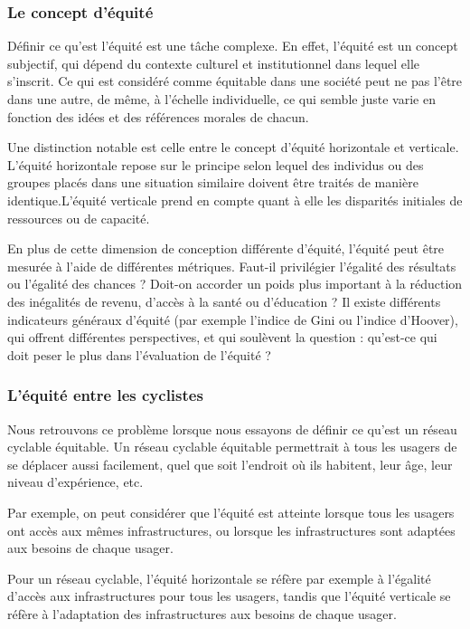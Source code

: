\subsubsection{Le concept d'équité}

Définir ce qu'est l'équité est une tâche complexe. En effet, l'équité est un concept subjectif, qui dépend du contexte culturel et institutionnel dans lequel elle s'inscrit. Ce qui est considéré comme équitable dans une société peut ne pas l'être dans une autre, de même, à l'échelle individuelle, ce qui semble juste varie en fonction des idées et des références morales de chacun.

Une distinction notable est celle entre le concept d'équité horizontale et verticale. L'équité horizontale repose sur le principe selon lequel des individus ou des groupes placés dans une situation similaire doivent être traités de manière identique.L'équité verticale prend en compte quant à elle les disparités initiales de ressources ou de capacité.

En plus de cette dimension de conception différente d'équité, l'équité peut être mesurée à l'aide de différentes métriques. Faut-il privilégier l'égalité des résultats ou l'égalité des chances ? Doit-on accorder un poids plus important à la réduction des inégalités de revenu, d'accès à la santé ou d'éducation ? Il existe différents indicateurs généraux d'équité (par exemple l'indice de Gini ou l'indice d'Hoover), qui offrent différentes perspectives, et qui soulèvent la question : qu'est-ce qui doit peser le plus dans l'évaluation de l'équité ?

\subsubsection{L'équité entre les cyclistes}

Nous retrouvons ce problème lorsque nous essayons de définir ce qu'est un réseau cyclable équitable. Un réseau cyclable équitable permettrait à tous les usagers de se déplacer aussi facilement, quel que soit l'endroit où ils habitent, leur âge, leur niveau d'expérience, etc. 

Par exemple, on peut considérer que l'équité est atteinte lorsque tous les usagers ont accès aux mêmes infrastructures, ou lorsque les infrastructures sont adaptées aux besoins de chaque usager.

Pour un réseau cyclable, l'équité horizontale se réfère par exemple à l'égalité d'accès aux infrastructures pour tous les usagers, tandis que l'équité verticale se réfère à l'adaptation des infrastructures aux besoins de chaque usager.

